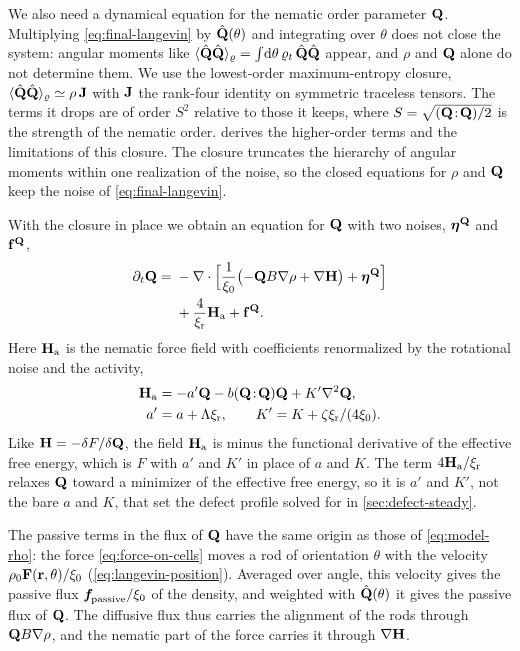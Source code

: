 \documentclass[aps,pre,reprint,superscriptaddress,longbibliography,nofootinbib
]{revtex4-2}
\begin{document}
We also need a dynamical equation for the nematic order
parameter $\mathbf{Q}$. Multiplying \cref{eq:final-langevin} by
$\hat{\mathbf{Q}}(\theta)$ and integrating over $\theta$ does not
close the system: angular moments like
$\langle\hat{\mathbf{Q}}\hat{\mathbf{Q}}\rangle_\varrho
=\int\!\mathrm{d}\theta\,\varrho_t\,\hat{\mathbf{Q}}\hat{\mathbf{Q}}$ appear, and
$\rho$ and $\mathbf{Q}$ alone do not determine them. We use the
lowest-order maximum-entropy closure,
$\langle\hat{\mathbf{Q}}\hat{\mathbf{Q}}\rangle_\varrho \simeq \rho\,\mathbf{J}$ with
$\mathbf{J}$ the rank-four identity on symmetric traceless tensors.
The terms it drops are of order $S^2$ relative to those it
keeps, where $S=\sqrt{(\mathbf{Q}\!:\!\mathbf{Q})/2}$ is the strength of
the nematic order.  derives the
higher-order terms and the limitations of this closure. The
closure truncates the hierarchy of angular moments within
one realization of the noise, so the closed equations for
$\rho$ and $\mathbf{Q}$ keep the noise of \cref{eq:final-langevin}.

With the closure in place we obtain an equation for $\mathbf{Q}$
with two noises, $\boldsymbol\eta^{\mathbf{Q}}$ and $\mathbf{f}^{\mathbf{Q}}$,
\begin{align}
  \label{eq:model-Q}
  \partial_t \mathbf{Q} = {}& -\nabla\cdot\Bigl[\frac1{\xi_0}
    \bigl(-\mathbf{Q} B \nabla\rho + \nabla \mathbf{H}\bigr) + \boldsymbol\eta^{\mathbf{Q}}\Bigr]
  \nonumber\\
  &+ \frac4{\xi_{\rm r}} \mathbf{H}_\text{a} + \mathbf{f}^{\mathbf{Q}}.
\end{align}
Here $\mathbf{H}_\text{a}$ is the nematic force field with coefficients
renormalized by the rotational noise and the activity,
\begin{align}
  \label{eq:H-active}
  \mathbf{H}_\text{a} &= -a'\mathbf{Q} - b(\mathbf{Q}\!:\!\mathbf{Q})\mathbf{Q} + K'\nabla^2\mathbf{Q},
  \nonumber\\
  a' &= a+\Lambda\xi_{\rm r}, \qquad K' = K+{\zeta\xi_{\rm r}}/({4\xi_0}).
\end{align}
Like $\mathbf{H}=-\delta F/\delta\mathbf{Q}$, the field $\mathbf{H}_\text{a}$ is minus the
functional derivative of the effective free energy, which
is $F$ with $a'$ and $K'$ in place of $a$ and $K$. The term
$4\mathbf{H}_\text{a}/\xi_{\rm r}$ relaxes $\mathbf{Q}$ toward a minimizer of the
effective free energy, so it is $a'$ and $K'$, not the bare
$a$ and $K$, that set the defect profile solved for in
\cref{sec:defect-steady}.

The passive terms in the flux of $\mathbf{Q}$ have the same origin
as those of \cref{eq:model-rho}: the force
\cref{eq:force-on-cells} moves a rod of orientation
$\theta$ with the velocity $\rho_0\mathbf{F}(\mathbf{r},\theta)/\xi_0$
(\cref{eq:langevin-position}). Averaged over angle, this
velocity gives the passive flux $\boldsymbol{f}_\text{\!passive}/\xi_0$ of the
density, and weighted with $\hat{\mathbf{Q}}(\theta)$ it gives the
passive flux of $\mathbf{Q}$. The diffusive flux thus carries the
alignment of the rods through $\mathbf{Q} B\nabla\rho$, and the
nematic part of the force carries it through $\nabla\mathbf{H}$.
\end{document}
